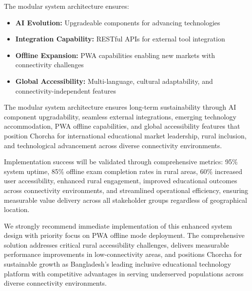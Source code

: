 \documentclass[12pt,a4paper,oneside]{book}
\begin{document}
The modular system architecture ensures:

\begin{itemize}
    \item \textbf{AI Evolution:} Upgradeable components for advancing technologies
    \item \textbf{Integration Capability:} RESTful APIs for external tool integration
    \item \textbf{Offline Expansion:} PWA capabilities enabling new markets with connectivity challenges
    \item \textbf{Global Accessibility:} Multi-language, cultural adaptability, and connectivity-independent features
\end{itemize}

\begin{tcolorbox}[benefitbox, title=Future-Ready Architecture Benefits]
The modular system architecture ensures long-term sustainability through AI component upgradability, seamless external integrations, emerging technology accommodation, PWA offline capabilities, and global accessibility features that position Chorcha for international educational market leadership, rural inclusion, and technological advancement across diverse connectivity environments.
\end{tcolorbox}

\begin{tcolorbox}[infobox, title=Success Measurement Framework]
Implementation success will be validated through comprehensive metrics: 95\% system uptime, 85\% offline exam completion rates in rural areas, 60\% increased user accessibility, enhanced rural engagement, improved educational outcomes across connectivity environments, and streamlined operational efficiency, ensuring measurable value delivery across all stakeholder groups regardless of geographical location.
\end{tcolorbox}

\begin{tcolorbox}[impactbox, title=Strategic Implementation Recommendation]
We strongly recommend immediate implementation of this enhanced system design with priority focus on PWA offline mode deployment. The comprehensive solution addresses critical rural accessibility challenges, delivers measurable performance improvements in low-connectivity areas, and positions Chorcha for sustainable growth as Bangladesh's leading inclusive educational technology platform with competitive advantages in serving underserved populations across diverse connectivity environments.
\end{tcolorbox}
\end{document}
